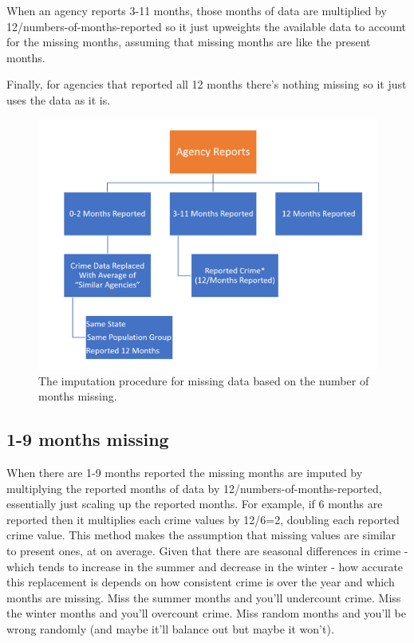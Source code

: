 \documentclass[
  12pt,
  openany]{book}
\begin{document}
When an agency reports 3-11 months, those months of data are multiplied by 12/numbers-of-months-reported so it just upweights the available data to account for the missing months, assuming that missing months are like the present months.

Finally, for agencies that reported all 12 months there's nothing missing so it just uses the data as it is.

\begin{figure}

{\centering \includegraphics[width=0.9\linewidth]{images/segments_flowchart} 

}

\caption{The imputation procedure for missing data based on the number of months missing.}\label{fig:countyImputation}
\end{figure}

\subsection{1-9 months missing}\label{months-missing}

When there are 1-9 months reported the missing months are imputed by multiplying the reported months of data by 12/numbers-of-months-reported, essentially just scaling up the reported months. For example, if 6 months are reported then it multiplies each crime values by 12/6=2, doubling each reported crime value. This method makes the assumption that missing values are similar to present ones, at on average. Given that there are seasonal differences in crime - which tends to increase in the summer and decrease in the winter - how accurate this replacement is depends on how consistent crime is over the year and which months are missing. Miss the summer months and you'll undercount crime. Miss the winter months and you'll overcount crime. Miss random months and you'll be wrong randomly (and maybe it'll balance out but maybe it won't).
\end{document}
